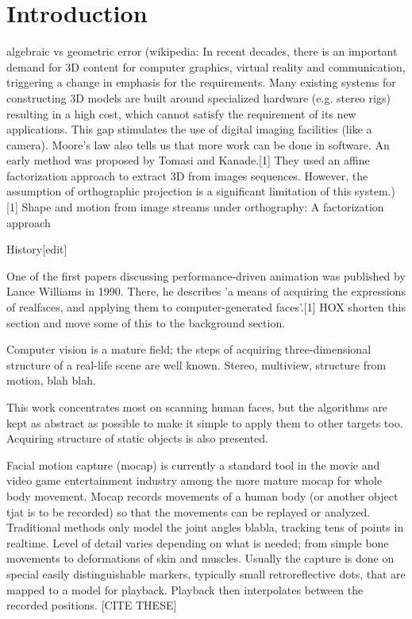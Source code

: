 \section{Introduction}

\thispagestyle{empty}
algebraic vs geometric error
(wikipedia: In recent decades, there is an important demand for 3D content for computer graphics, virtual reality and communication, triggering a change in emphasis for the requirements. Many existing systems for constructing 3D models are built around specialized hardware (e.g. stereo rigs) resulting in a high cost, which cannot satisfy the requirement of its new applications. This gap stimulates the use of digital imaging facilities (like a camera). Moore's law also tells us that more work can be done in software. An early method was proposed by Tomasi and Kanade.[1] They used an affine factorization approach to extract 3D from images sequences. However, the assumption of orthographic projection is a significant limitation of this system.)
[1] Shape and motion from image streams under orthography: A factorization approach

History[edit]

One of the first papers discussing performance-driven animation was published by Lance Williams in 1990. There, he describes 'a means of acquiring the expressions of realfaces, and applying them to computer-generated faces'.[1]
HOX shorten this section and move some of this to the background section.

Computer vision is a mature field; the steps of acquiring three-dimensional structure of a real-life scene are well known.
Stereo, multiview, structure from motion, blah blah.

This work concentrates most on scanning human faces, but the algorithms are kept as abstract as possible to make it simple to apply them to other targets too.
Acquiring structure of static objects is also presented.

Facial motion capture (mocap) is currently a standard tool in the movie and video game entertainment industry among the more mature mocap for whole body movement.
Mocap records movements of a human body (or another object tjat is to be recorded) so that the movements can be replayed or analyzed. Traditional methods only model the joint angles blabla, tracking tens of points in realtime.
Level of detail varies depending on what is needed; from simple bone movements to deformations of skin and muscles.
Usually the capture is done on special easily distinguishable markers, typically small retroreflective dots, that are mapped to a model for playback. Playback then interpolates between the recorded positions. [CITE THESE]

